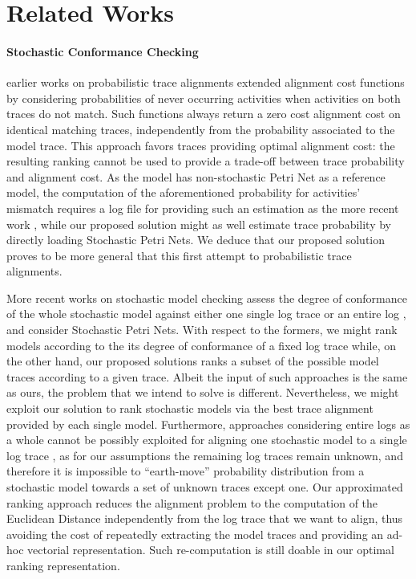 \section{Related Works}
\paragraph*{Stochastic Conformance Checking} earlier works on probabilistic trace alignments \cite{AlizadehLZ14a} extended alignment cost functions by considering probabilities of never occurring activities when activities on both traces do not match. Such functions always return a zero cost alignment cost on identical matching traces, independently from the probability associated to the model trace. This approach favors traces providing optimal alignment cost: the resulting ranking cannot be used to provide a trade-off between trace probability and alignment cost. As the model has non-stochastic Petri Net as a reference model, the computation of the aforementioned probability for activities' mismatch requires a log file for providing such an estimation as the more recent work \cite{spdwe}, while our proposed solution might as well estimate trace probability by directly loading Stochastic Petri Nets. We  deduce that our proposed solution proves to be more general that this first attempt to probabilistic trace alignments. 

More recent works on stochastic model checking  assess the degree of conformance of the whole stochastic model against either one single log trace \cite{DBLP:conf/icpm/PolyvyanyyK19,DBLP:journals/tosem/PolyvyanyySWCM20} or an entire log \cite{LeemansSA19}, and consider Stochastic Petri Nets. %
With respect to the formers, we might rank models according to the its degree of conformance of a fixed log trace while, on the other hand, our proposed solutions ranks a subset of the possible model traces according to a given trace. Albeit the input of such approaches is the same as ours, the problem that we intend to solve is different. Nevertheless, we might exploit our solution to rank stochastic models via the best trace alignment provided by each single model.  Furthermore, approaches considering entire logs as a whole cannot be possibly exploited for aligning one stochastic model to a single log trace \cite{LeemansSA19}, as for our assumptions the remaining log traces remain unknown, and therefore it is impossible to ``earth-move'' probability distribution from a stochastic model towards a set of unknown traces except one. Our approximated ranking approach reduces the alignment problem to the computation of the Euclidean Distance independently from the log trace that we want to align, thus avoiding the cost of repeatedly extracting the model traces and providing an ad-hoc vectorial representation. Such re-computation is still doable in our optimal ranking representation.

